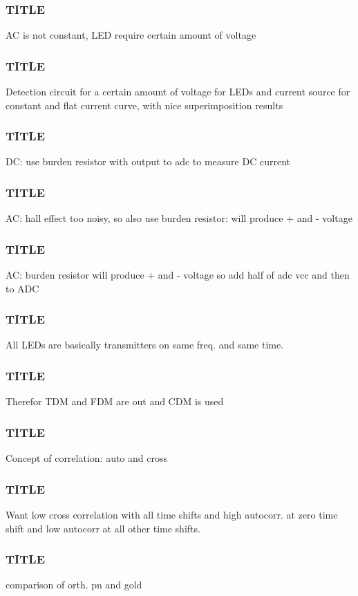 \documentclass{beamer}
\begin{document}
	\begin{frame}\frametitle{TITLE}
		AC is not constant, LED require certain amount of voltage
	\end{frame}

	\begin{frame}\frametitle{TITLE}
		Detection circuit for a certain amount of voltage for LEDs and current source for constant and flat current curve, with nice superimposition results
	\end{frame}

	\begin{frame}\frametitle{TITLE}
		DC: use burden resistor with output to adc to measure DC current
	\end{frame}

	\begin{frame}\frametitle{TITLE}
		AC: hall effect too noisy, so also use burden resistor: will produce + and - voltage
	\end{frame}

	\begin{frame}\frametitle{TITLE}
		AC: burden resistor will produce + and - voltage so add half of adc vcc and then to ADC
	\end{frame}





	\begin{frame}\frametitle{TITLE}
		All LEDs are basically transmitters on same freq. and same time.
	\end{frame}

	\begin{frame}\frametitle{TITLE}
		Therefor TDM and FDM are out and CDM is used
	\end{frame}

	\begin{frame}\frametitle{TITLE}
		Concept of correlation: auto and cross
	\end{frame}

	\begin{frame}\frametitle{TITLE}
		Want low cross correlation with all time shifts and high autocorr. at zero time shift and low autocorr at all other time shifts.
	\end{frame}

	\begin{frame}\frametitle{TITLE}
		comparison of orth. pn and gold
	\end{frame}



\end{document}
